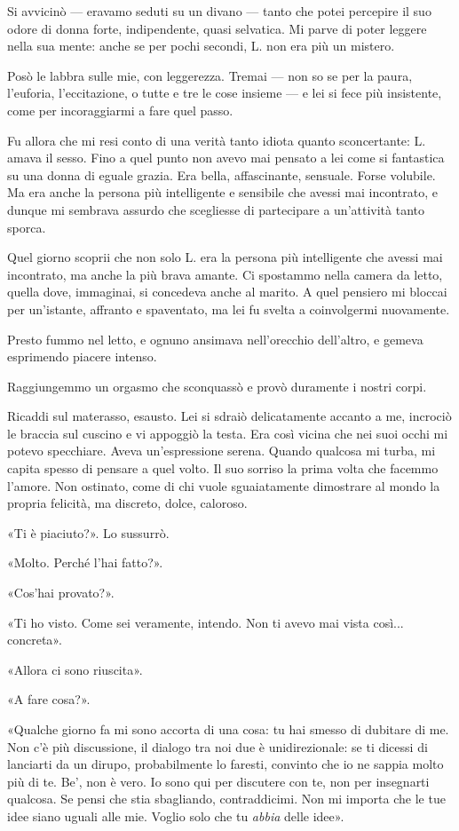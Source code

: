 \documentclass[a4paper,11pt,oneside,openright,final]{memoir}
\begin{document}
Si avvicinò --- eravamo seduti su un divano --- tanto che potei percepire il suo
odore di donna forte, indipendente, quasi selvatica. Mi parve di poter leggere
nella sua mente: anche se per pochi secondi, L. non era più un mistero.

Posò le labbra sulle mie, con leggerezza. Tremai --- non so se per la paura,
l'euforia, l'eccitazione, o tutte e tre le cose insieme --- e lei si fece più
insistente, come per incoraggiarmi a fare quel passo.

Fu allora che mi resi conto di una verità tanto idiota quanto sconcertante:
L. amava il sesso. Fino a quel punto non avevo mai pensato a lei come si
fantastica su una donna di eguale grazia. Era bella, affascinante, sensuale.
Forse volubile. Ma era anche la persona più intelligente e sensibile che avessi
mai incontrato, e dunque mi sembrava assurdo che scegliesse di partecipare a
un'attività tanto sporca.

Quel giorno scoprii che non solo L. era la persona più intelligente che avessi
mai incontrato, ma anche la più brava amante. Ci spostammo nella camera da
letto, quella dove, immaginai, si concedeva anche al marito. A quel pensiero mi
bloccai per un'istante, affranto e spaventato, ma lei fu svelta a coinvolgermi
nuovamente.

Presto fummo nel letto, e ognuno ansimava nell'orecchio dell'altro, e gemeva
esprimendo piacere intenso.

Raggiungemmo un orgasmo che sconquassò e provò duramente i nostri corpi.

Ricaddi sul materasso, esausto. Lei si sdraiò delicatamente accanto a me,
incrociò le braccia sul cuscino e vi appoggiò la testa. Era così vicina che nei
suoi occhi mi potevo specchiare. Aveva un'espressione serena. Quando qualcosa mi
turba, mi capita spesso di pensare a quel volto. Il suo sorriso la prima volta
che facemmo l'amore. Non ostinato, come di chi vuole sguaiatamente dimostrare al
mondo la propria felicità, ma discreto, dolce, caloroso.

«Ti è piaciuto?». Lo sussurrò.

«Molto. Perché l'hai fatto?».

«Cos'hai provato?».

«Ti ho visto. Come sei veramente, intendo. Non ti avevo mai vista così...
concreta».

«Allora ci sono riuscita».

«A fare cosa?».

«Qualche giorno fa mi sono accorta di una cosa: tu hai smesso di dubitare di me.
Non c'è più discussione, il dialogo tra noi due è unidirezionale: se ti dicessi
di lanciarti da un dirupo, probabilmente lo faresti, convinto che io ne sappia
molto più di te. Be', non è vero. Io sono qui per discutere con te, non per
insegnarti qualcosa. Se pensi che stia sbagliando, contraddicimi. Non mi importa
che le tue idee siano uguali alle mie. Voglio solo che tu \emph{abbia} delle
idee».
\end{document}
